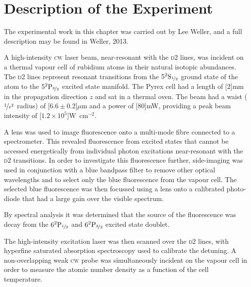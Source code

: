 \section{Description of the Experiment}
  \label{sec:twophoton_experiment}

    The experimental work in this chapter was carried out by Lee Weller, and a
    full description may be found in Weller, 2013\cite{Weller2013a}.

    A high-intensity \textsc{cw} laser beam, near-resonant with the \textsc{d2}
    lines, was incident on a thermal vapour cell of rubidium atoms in their
    natural isotopic abundances. The \textsc{d2} lines represent resonant
    transitions from the $5^2\rm{S}_{\nicefrac{1}{2}}$ ground state of the
    atom to the $5^2\rm{P}_{\nicefrac{3}{2}}$ excited state manifold. The
    Pyrex cell had a length of \unit[$2$]{mm} in the propagation direction $z$
    and sat in a thermal oven. The beam had a waist (\ie $\nicefrac{1}{e^2}$
    radius) of \unit[$6.6\pm0.2$]{$\mu$m} and a power of \unit[$80$]{mW},
    providing a peak beam intensity of 
    \unit[$1.2\times10^5$]{W~cm$^{-2}$}\cite{Weller2013a}.

    A lens was used to image fluorescence onto a multi-mode fibre connected to a
    spectrometer. This revealed fluorescence from excited states that cannot be
    accessed energetically from individual photon excitations near-resonant with
    the \textsc{d2} transitions. In order to investigate this fluorescence
    further, side-imaging was used in conjunction with a blue bandpass filter to
    remove other optical wavelengths and to select only the blue fluorescence
    from the vapour cell. The selected blue fluorescence was then focussed
    using a lens onto a calibrated photo-diode that had a large gain over the
    visible spectrum.

    By spectral analysis it was determined that the source of the fluorescence
    was decay from the $6^2\rm{P}_{\nicefrac{1}{2}}$ and
    $6^2\rm{P}_{\nicefrac{3}{2}}$ excited state doublet.

    The high-intensity excitation laser was then scanned over the \textsc{d2}
    lines, with hyperfine saturated absorption spectroscopy used to calibrate
    the detuning. A non-overlapping weak \textsc{cw} probe was simultaneously
    incident on the vapour cell in order to measure the atomic number density as
    a function of the cell temperature.

